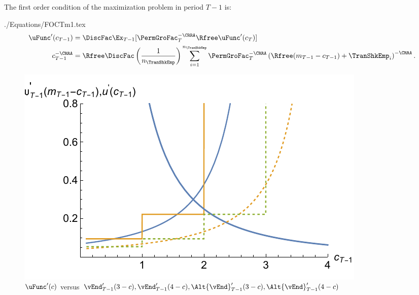 \documentclass[titlepage, headings=optiontotocandhead]{\econtex}
\begin{document}
The first order condition of the maximization problem in period $T-1$ is:
\begin{verbatimwrite}{./Equations/FOCTm1.tex}
  \begin{equation}\begin{gathered}\begin{aligned}
        \uFunc^{\prime}({c}_{T-1})       & = \DiscFac \Ex_{T-1} [\PermGroFac_{T}^{-\CRRA}\Rfree \uFunc^{\prime}({c}_{T})]  %
        \\      {c}_{T-1}^{-\CRRA}   & = \Rfree \DiscFac \left(\frac{1}{n_{\TranShkEmp}}\right) \sum_{i=1}^{n_{\TranShkEmp}} \PermGroFac_{T}^{-\CRRA}\left(\Rfree ({m}_{T-1}-{c}_{T-1}) + \TranShkEmp_{i}\right)^{-\CRRA} \label{eq:FOCTm1}.
      \end{aligned}\end{gathered}\end{equation}
\end{verbatimwrite}
\unskip
{}
\hypertarget{PlotuPrimeVSOPrime}{}
\begin{figure}
  \includegraphics{./Figures/PlotuPrimeVSOPrime}
  \caption{$\uFunc^{\prime}(c)$ versus $\vEnd_{T-1}^{\prime}(3-c), \vEnd_{T-1}^{\prime}(4-c), \Alt{\vEnd}_{T-1}^{\prime}(3-c), \Alt{\vEnd}_{T-1}^{\prime}(4-c)$}
  \label{fig:PlotuPrimeVSOPrime}
\end{figure}
\end{document}
